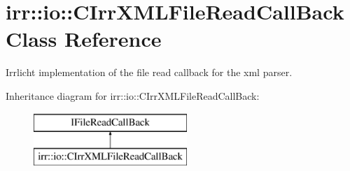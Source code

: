 \hypertarget{classirr_1_1io_1_1_c_irr_x_m_l_file_read_call_back}{\section{irr\-:\-:io\-:\-:C\-Irr\-X\-M\-L\-File\-Read\-Call\-Back Class Reference}
\label{classirr_1_1io_1_1_c_irr_x_m_l_file_read_call_back}
}


Irrlicht implementation of the file read callback for the xml parser.  


Inheritance diagram for irr\-:\-:io\-:\-:C\-Irr\-X\-M\-L\-File\-Read\-Call\-Back\-:\begin{figure}[H]
\begin{center}
\leavevmode
\includegraphics[height=2.000000cm]{classirr_1_1io_1_1_c_irr_x_m_l_file_read_call_back}
\end{center}
\end{figure}
